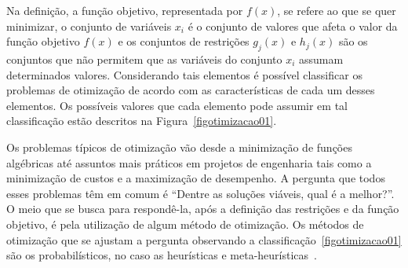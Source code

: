 Na definição, a função objetivo, representada por $f(x)$, se refere ao que se quer minimizar, o conjunto de variáveis $x_i$ é o conjunto de valores que afeta o valor da função objetivo $f(x)$ e os conjuntos de restrições $g_j(x)$ e $h_j(x)$ são os conjuntos que não permitem que as variáveis do conjunto $x_i$ assumam determinados valores. Considerando tais elementos é possível classificar os problemas de otimização de acordo com as características de cada um desses elementos. Os possíveis valores que cada elemento pode assumir em tal classificação estão descritos na Figura~\ref{figotimizacao01}.

Os problemas típicos de otimização vão desde a minimização de funções algébricas até assuntos mais práticos em projetos de engenharia tais como a minimização de custos e a maximização de desempenho. A pergunta que todos esses problemas têm em comum é ``Dentre as soluções viáveis, qual é a melhor?''. O meio que se busca para respondê-la, após a definição das restrições e da função objetivo, é pela utilização de algum método de otimização. Os métodos de otimização que se ajustam a pergunta observando a classificação~\ref{figotimizacao01} são os probabilísticos, no caso as heurísticas e meta-heurísticas~\cite{gandomi2013metaheuristic}. 

